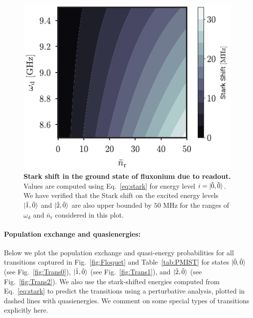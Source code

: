 \documentclass[%
reprint,
superscriptaddress,
 amsmath,amssymb,
 aps,
 prx,
longbibliography,
floatfix,
]{revtex4-2}
\begin{document}
 \begin{figure}
     \centering
     \includegraphics[width=\linewidth]{Supp_Fig/Stark-shift.pdf}
     \caption{\textbf{Stark shift in the ground state of fluxonium due to readout.} Values are computed using Eq.~\ref{eq:stark} for energy level $i=\ket{\tilde{0},\tilde{0}}$. We have verified that the Stark shift on the excited energy levels $\ket{\tilde{1},\tilde{0}}$ and $\ket{\tilde{2},\tilde{0}}$ are also upper bounded by $50$ MHz for the ranges of $\omega_\textrm{d}$ and $\bar n_\textrm{r}$ considered in this plot.}
     \label{fig:stark-shift}
 \end{figure}

\paragraph{Population exchange and quasienergies:}\label{app:Floquet-trans}
Below we plot the population exchange and quasi-energy probabilities for all transitions captured in Fig.~\ref{fig:Floquet} and Table~\ref{tab:PMIST} for states $\ket{\tilde{0},\tilde{0}}$ (see Fig.~\ref{fig:Trans0}), $\ket{\tilde{1},\tilde{0}}$ (see Fig.~\ref{fig:Trans1}), and $\ket{\tilde{2},\tilde{0}}$ (see Fig.~\ref{fig:Trans2}). We also use the stark-shifted energies computed from Eq.~\ref{eq:stark} to predict the transitions using a perturbative analysis, plotted in dashed lines with quasienergies. We comment on some special types of transitions explicitly here.
\end{document}

